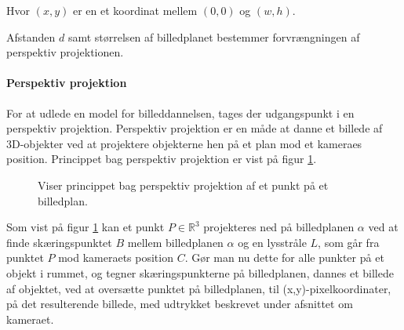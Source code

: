 Hvor $(x,y)$ er en et koordinat mellem $(0,0)$ og $(w,h)$.

Afstanden $d$ samt størrelsen af billedplanet bestemmer forvrængningen af perspektiv projektionen.

\paragraph{Perspektiv projektion}
\label{sec:perspektiv_projektion}
For at udlede en model for billeddannelsen, tages der udgangspunkt i en perspektiv projektion. Perspektiv projektion er en måde at danne et billede af 3D-objekter ved at projektere objekterne hen på et plan mod et kameraes position\cite{fig:perspective_projection}. Princippet bag perspektiv projektion er vist på figur \ref{fig:perspektiv_projektion}.

\begin{figure}[H]
  \centering
  \caption{Viser princippet bag perspektiv projektion af et punkt på et billedplan.}
  \label{fig:perspektiv_projektion}
\end{figure}

Som vist på figur \ref{fig:perspektiv_projektion} kan et punkt $P\in \mathbb{R}^3$ projekteres ned på billedplanen $\alpha$ ved at finde skæringspunktet $B$ mellem billedplanen $\alpha$ og en lysstråle $L$, som går fra punktet $P$ mod kameraets position $C$. Gør man nu dette for alle punkter på et objekt i rummet, og tegner skæringspunkterne på billedplanen, dannes et billede af objektet, ved at oversætte punktet på billedplanen, til (x,y)-pixelkoordinater, på det resulterende billede, med udtrykket beskrevet under afsnittet om kameraet.

